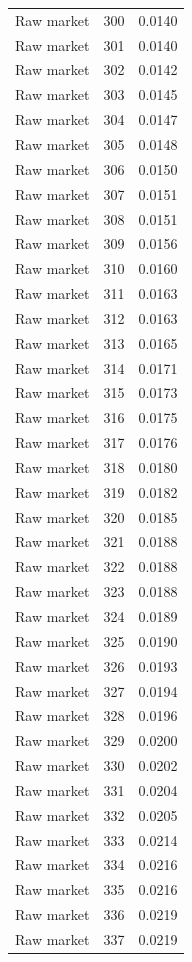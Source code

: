 \begin{table}[htbp]
\begin{tabular}{lll}
Raw market & 300 & 0.0140 \\
Raw market & 301 & 0.0140 \\
Raw market & 302 & 0.0142 \\
Raw market & 303 & 0.0145 \\
Raw market & 304 & 0.0147 \\
Raw market & 305 & 0.0148 \\
Raw market & 306 & 0.0150 \\
Raw market & 307 & 0.0151 \\
Raw market & 308 & 0.0151 \\
Raw market & 309 & 0.0156 \\
Raw market & 310 & 0.0160 \\
Raw market & 311 & 0.0163 \\
Raw market & 312 & 0.0163 \\
Raw market & 313 & 0.0165 \\
Raw market & 314 & 0.0171 \\
Raw market & 315 & 0.0173 \\
Raw market & 316 & 0.0175 \\
Raw market & 317 & 0.0176 \\
Raw market & 318 & 0.0180 \\
Raw market & 319 & 0.0182 \\
Raw market & 320 & 0.0185 \\
Raw market & 321 & 0.0188 \\
Raw market & 322 & 0.0188 \\
Raw market & 323 & 0.0188 \\
Raw market & 324 & 0.0189 \\
Raw market & 325 & 0.0190 \\
Raw market & 326 & 0.0193 \\
Raw market & 327 & 0.0194 \\
Raw market & 328 & 0.0196 \\
Raw market & 329 & 0.0200 \\
Raw market & 330 & 0.0202 \\
Raw market & 331 & 0.0204 \\
Raw market & 332 & 0.0205 \\
Raw market & 333 & 0.0214 \\
Raw market & 334 & 0.0216 \\
Raw market & 335 & 0.0216 \\
Raw market & 336 & 0.0219 \\
Raw market & 337 & 0.0219 \\

\end{tabular}
\end{table}
